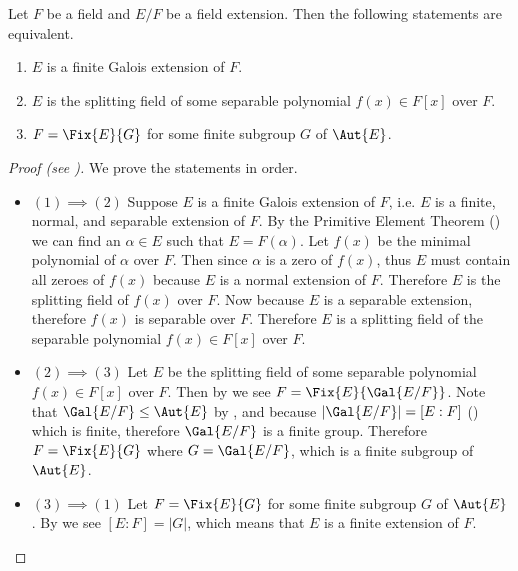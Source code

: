 \begin{theorem}\label{thrm-equivalence-of-finite-galois-extension}
    Let $F$ be a field and $E/F$ be a field extension. Then the following statements are equivalent.
    \begin{enumerate}
        \item $E$ is a finite Galois extension of $F$.
        \item $E$ is the splitting field of some separable polynomial $f(x) \in F[x]$ over $F$.
        \item $F = \Fix{E}{G}$ for some finite subgroup $G$ of $\Aut{E}$.
    \end{enumerate}
\end{theorem}
\begin{proof}[Proof (see {\cite[Theorem 23.19]{judson_beezer_2022}})]
    We prove the statements in order.
    \begin{itemize}
        \item $\boxed{(1) \implies (2)}$ Suppose $E$ is a finite Galois extension of $F$, i.e. $E$ is a finite, normal, and separable extension of $F$. By the Primitive Element Theorem () we can find an $\alpha \in E$ such that $E = F(\alpha)$. Let $f(x)$ be the minimal polynomial of $\alpha$ over $F$. Then since $\alpha$ is a zero of $f(x)$, thus $E$ must contain all zeroes of $f(x)$ because $E$ is a normal extension of $F$. Therefore $E$ is the splitting field of $f(x)$ over $F$. Now because $E$ is a separable extension, therefore $f(x)$ is separable over $F$. Therefore $E$ is a splitting field of the separable polynomial $f(x) \in F[x]$ over $F$.

        \item $\boxed{(2) \implies (3)}$ Let $E$ be the splitting field of some separable polynomial $f(x) \in F[x]$ over $F$. Then by  we see $F = \Fix{E}{\Gal{E/F}}$. Note that $\Gal{E/F} \leq \Aut{E}$ by , and because $|\Gal{E/F}| = [E:F]$ () which is finite, therefore $\Gal{E/F}$ is a finite group. Therefore $F = \Fix{E}{G}$ where $G = \Gal{E/F}$, which is a finite subgroup of $\Aut{E}$.

        \item $\boxed{(3) \implies (1)}$ Let $F = \Fix{E}{G}$ for some finite subgroup $G$ of $\Aut{E}$. By  we see $[E:F] = |G|$, which means that $E$ is a finite extension of $F$.


\end{itemize}
\end{proof}
